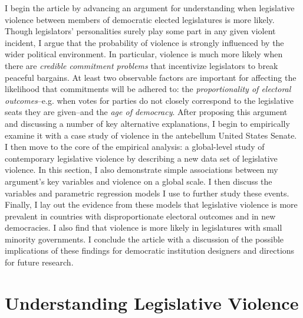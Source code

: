 \documentclass[a4paper]{article}\usepackage[]{graphicx}\usepackage[]{color}
\begin{document}
I begin the article by advancing an argument for understanding when legislative violence between members of democratic elected legislatures is more likely. Though legislators' personalities surely play some part in any given violent incident, I argue that the probability of violence is strongly influenced by the wider political environment. In particular, violence is much more likely when there are \emph{credible commitment problems} that incentivize legislators to break peaceful bargains. At least two observable factors are important for affecting the likelihood that commitments will be adhered to: the \emph{proportionality of electoral outcomes}--e.g. when votes for parties do not closely correspond to the legislative seats they are given--and the \emph{age of democracy}. After proposing this argument and discussing a number of key alternative explanations, I begin to empirically examine it with a case study of violence in the antebellum United States Senate. I then move to the core of the empirical analysis: a global-level study of contemporary legislative violence by describing a new data set of legislative violence. In this section, I also demonstrate simple associations between my argument's key variables and violence on a global scale. I then discuss the variables and parametric regression models I use to further study these events. Finally, I lay out the evidence from these models that legislative violence is more prevalent in countries with disproportionate electoral outcomes and in new democracies. I also find that violence is more likely in legislatures with small minority governments. I conclude the article with a discussion of the possible implications of these findings for democratic institution designers and directions for future research.


\section*{Understanding Legislative Violence}
\end{document}
